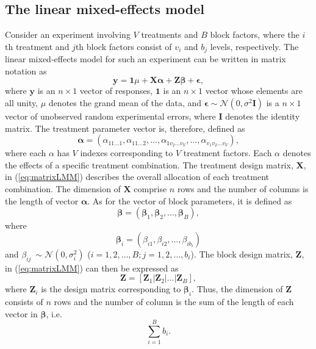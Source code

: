 \documentclass[article]{jss}
\newcommand{\I}{\mathbf{I}}
\newcommand{\Z}{\mathbf{Z}}
\newcommand{\X}{\mathbf{X}}
\begin{document}
\subsection{The linear mixed-effects model}
\label{subsec:matrixLMM}
Consider an experiment involving $V$ treatments and $B$ block factors, where the $i$th treatment and $j$th block factors consist of $v_i$ and $b_j$ levels, respectively. The linear mixed-effects model for such an experiment can be written in matrix notation as
\begin{equation}\label{eq:matrixLMM}
\bm{y} = \mathbf{1}\mu + \X \bm{\alpha} + \Z\bm{\beta} + \bm{\epsilon},
\end{equation}
where $\bm{y}$ is an $n \times 1$ vector of responses, $\mathbf{1}$ is an $n \times 1$ vector whose elements are all unity, $\mu$ denotes the grand mean of the data, and $\bm{\epsilon}\sim \mathcal{N}(0,\sigma^2 \I)$ is a $n \times 1$ vector of unobserved random experimental errors, where $\I$ denotes the identity matrix. The treatment parameter vector is, therefore, defined as 
\begin{equation}
\label{eq:treatPar}
\bm{\alpha} = (\alpha_{11 \dots 1}, \alpha_{11 \dots 2}, \dots,  \alpha_{1v_2 \dots v_V},\dots,\alpha_{v_1 v_2 \dots v_V}),
\end{equation}
where each $\alpha$ has $V$ indexes corresponding to $V$ treatment factors. Each $\alpha$ denotes the effects of a specific treatment combination. The treatment design matrix, $\X$, in (\ref{eq:matrixLMM}) describes the overall allocation of each treatment combination. The dimension of $\X$ comprise $n$ rows and the number of columns is the length of vector $\bm{\alpha}$. As for the vector of block parameters, it is defined as
\begin{equation}\label{eq:block1Par}
\bm{\beta} = (\bm{\beta}_1, \bm{\beta}_2, \ldots, \bm{\beta}_B), 
\end{equation} 
where
\[
\bm{\beta}_i = (\beta_{i1}, \beta_{i2}, \dots, \beta_{i b_i})
\]
and 
$\beta_{ij} ~ \sim \mathcal{N}(0, \sigma_i^2)$ ($i=1,2,\dots,B; j=1,2,\dots, b_i$). The block design matrix, $\Z$, in (\ref{eq:matrixLMM}) can then be expressed as 
\begin{equation}\label{eq:block1Mat}
\Z = [\Z_1 \vert \Z_2 \vert \ldots \vert \Z_B ],
\end{equation}
where $\Z_i$ is the design matrix corresponding to $\bm{\beta}_i$. Thus, the dimension of $\Z$ consists of $n$ rows and the number of column is the sum of the length of each vector in $\bm{\beta}$, i.e.\
\[
\sum^{B}_{i = 1} b_i.
\]
\end{document}
